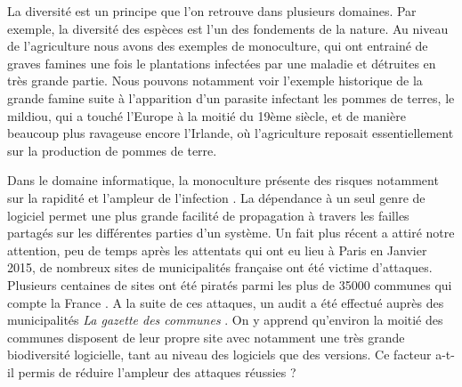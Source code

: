 La diversité est un principe que l'on retrouve dans plusieurs domaines. Par exemple, la diversité des espèces est l’un des fondements de la nature. Au niveau de l’agriculture nous avons des exemples de monoculture, qui ont entrainé de graves famines une fois le plantations infectées par une maladie et détruites en très grande partie. Nous pouvons notamment voir l’exemple historique de la grande famine suite à l’apparition d’un parasite infectant les pommes de terres, le mildiou, qui a touché l’Europe à la moitié du 19ème siècle, et de manière beaucoup plus ravageuse encore l'Irlande, où l’agriculture reposait essentiellement sur la production de pommes de terre.

Dans le domaine informatique, la monoculture présente des risques notamment sur la rapidité et l’ampleur de l’infection \cite{risksOfMonoculture}. La dépendance à un seul genre de logiciel permet une plus grande facilité de propagation à travers les failles partagés sur les différentes parties d'un système.
Un fait plus récent a attiré notre attention, peu de temps après les attentats qui ont eu lieu à Paris en Janvier 2015, de nombreux sites de municipalités française ont été victime d’attaques. Plusieurs centaines de sites ont été piratés parmi les plus de 35000 communes qui compte la France \cite{communes_INSEE}. A la suite de ces attaques, un audit a été effectué auprès des municipalités \textit{La gazette des communes} . On y apprend qu’environ la moitié des communes disposent de leur propre site avec notamment une très grande biodiversité logicielle, tant au niveau des logiciels que des versions. Ce facteur a-t-il permis de réduire l’ampleur des attaques réussies ?

